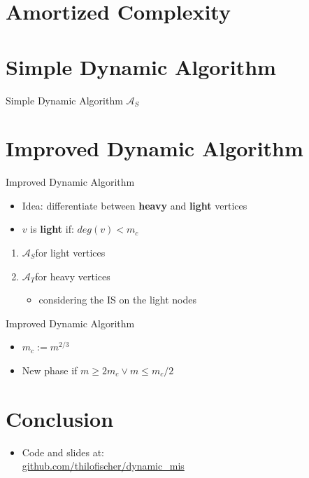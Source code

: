 \documentclass{beamer}
\newcommand{\trivial}{$\mathcal{A}_T$}
\newcommand{\simple}{$\mathcal{A}_S$}
\begin{document}
\section{Amortized Complexity}
\begin{frame}
  
\end{frame}

\section{Simple Dynamic Algorithm}
\begin{frame}{Simple Dynamic Algorithm \simple}
  
\end{frame}

\section{Improved Dynamic Algorithm}
\begin{frame}{Improved Dynamic Algorithm}
  \begin{itemize}
    \item Idea: differentiate between \textbf{heavy} and \textbf{light} vertices
    \item $v$ is \textbf{light} if: $deg(v) < m_c$
  \end{itemize}
  \begin{enumerate}
    \pause
    \bigskip
    \item \simple for light vertices
    \medskip
    \item \trivial for heavy vertices
    \begin{itemize}
      \item considering the IS on the light nodes
    \end{itemize}
  \end{enumerate} 
\end{frame}

\begin{frame}{Improved Dynamic Algorithm}
  \begin{itemize}
    \item $m_c := m^{2/3}$
    \item New phase if $m \geq 2m_c \lor m \leq m_c/2$
  \end{itemize}
\end{frame}

\section{Conclusion}
\begin{frame}
  \begin{itemize}
    \item Code and slides at: \\
          \href{https://www.github.com/thilofischer/dynamic_mis}{github.com/thilofischer/dynamic\_mis}
  \end{itemize}
\end{frame}
\end{document}
